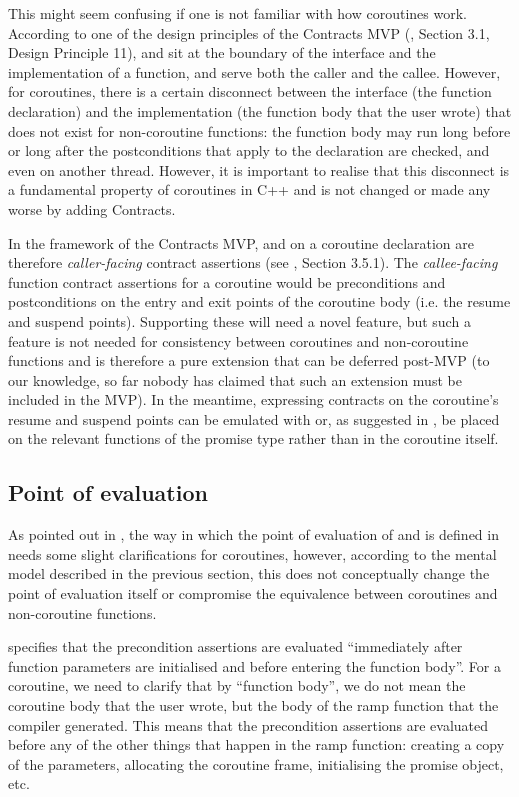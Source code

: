 This might seem confusing if one is not familiar with how coroutines work. According to one of the design principles of the Contracts MVP (\cite{P2900R8}, Section 3.1, Design Principle 11),  and  sit at the boundary of the interface and the implementation of a function, and serve both  the caller and the callee. However, for coroutines, there is a certain disconnect between the interface (the function declaration) and the implementation (the function body that the user wrote) that does not exist for non-coroutine functions: the function body may run long before or long after the postconditions that apply to the declaration are checked, and even on another thread. However, it is important to realise that this disconnect is a fundamental property of coroutines in C++ and is not changed or made any worse by adding Contracts.

In the framework of the Contracts MVP,  and  on a coroutine declaration are therefore \emph{caller-facing} contract assertions (see \cite{P2900R8}, Section 3.5.1). The \emph{callee-facing} function contract assertions for a coroutine would be preconditions and postconditions on the entry and exit points of the coroutine body (i.e. the resume and suspend points). Supporting these will need a novel feature, but such a feature is not needed for consistency between coroutines and non-coroutine functions and is therefore a pure extension that can be deferred post-MVP (to our knowledge, so far nobody has claimed that such an extension must be included in the MVP). In the meantime, expressing contracts on the coroutine's resume and suspend points can be emulated with  or, as suggested in \cite{P3251R0}, be placed on the relevant functions of the promise type rather than in the coroutine itself.

\subsection{Point of evaluation}

As pointed out in \cite{P2957R1}, the way in which the point of evaluation of  and  is defined in \cite{P2900R8} needs some slight clarifications for coroutines, however, according to the mental model described in the previous section, this does not conceptually change the point of evaluation itself or compromise the equivalence between coroutines and non-coroutine functions.

\cite{P2900R8} specifies that the precondition assertions are evaluated ``immediately after function parameters are initialised and before entering the function body''. For a coroutine, we need to clarify that by ``function body'', we do not mean the coroutine body that the user wrote, but the body of the ramp function that the compiler generated. This means that the precondition assertions are evaluated before any of the other things that happen in the ramp function: creating a copy of the parameters, allocating the coroutine frame, initialising the promise object, etc.

